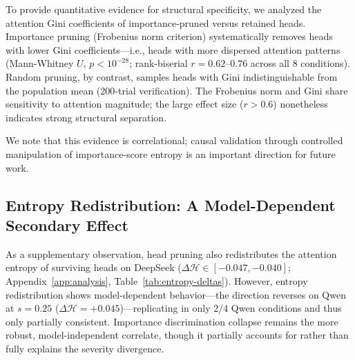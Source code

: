 To provide quantitative evidence for structural specificity, we analyzed the attention Gini coefficients of importance-pruned versus retained heads. Importance pruning (Frobenius norm criterion) systematically removes heads with lower Gini coefficients---i.e., heads with more dispersed attention patterns (Mann-Whitney $U$, $p < 10^{-28}$; rank-biserial $r = 0.62$--$0.76$ across all 8 conditions). Random pruning, by contrast, samples heads with Gini indistinguishable from the population mean (200-trial verification). The Frobenius norm and Gini share sensitivity to attention magnitude; the large effect size ($r > 0.6$) nonetheless indicates strong structural separation.

We note that this evidence is correlational; causal validation through controlled manipulation of importance-score entropy is an important direction for future work.

\subsection{Entropy Redistribution: A Model-Dependent Secondary Effect}
\label{sec:entropy-redistribution-main}

As a supplementary observation, head pruning also redistributes the attention entropy of surviving heads on DeepSeek ($\Delta\mathcal{H} \in [-0.047, -0.040]$; Appendix~\ref{app:analysis}, Table~\ref{tab:entropy-deltas}). However, entropy redistribution shows model-dependent behavior---the direction reverses on Qwen at $s{=}0.25$ ($\Delta\mathcal{H} = +0.045$)---replicating in only 2/4 Qwen conditions and thus only partially consistent. Importance discrimination collapse remains the more robust, model-independent correlate, though it partially accounts for rather than fully explains the severity divergence.
